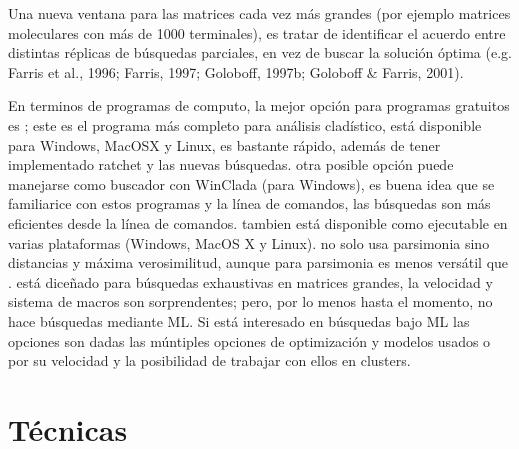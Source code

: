 Una nueva ventana para las matrices cada vez m\'as grandes (por ejemplo matrices moleculares con m\'as de 1000 terminales),  es tratar de identificar el acuerdo entre distintas r\'eplicas de b\'usquedas parciales,  en vez de buscar la soluci\'on \'optima {\color{red}(e.g. Farris et al.,  1996; Farris,  1997; Goloboff,  1997b; Goloboff \& Farris,  2001)}. 

En terminos de programas de computo,  la mejor opci\'on para programas gratuitos es ; este es el programa m\'as  completo para an\'alisis clad\'istico, est\'a disponible para Windows, MacOSX y Linux, es bastante r\'apido, adem\'as de tener implementado ratchet y las nuevas b\'usquedas.   otra posible opci\'on puede manejarse como buscador con WinClada (para Windows),  es buena idea que se familiarice con estos programas y la l\'inea de comandos, las b\'usquedas son m\'as eficientes desde la l\'inea de comandos.   tambien est\'a disponible como ejecutable en varias plataformas (Windows, MacOS X y Linux).    no solo usa parsimonia sino distancias y m\'axima verosimilitud, aunque para parsimonia es menos vers\'atil que .   est\'a dice\~nado para b\'usquedas exhaustivas en matrices grandes, la velocidad y sistema de macros son sorprendentes; pero, por lo menos hasta el momento, no hace b\'usquedas mediante ML. Si est\'a interesado en b\'usquedas bajo ML las opciones son  dadas las m\'untiples opciones de optimizaci\'on y modelos usados o  por su velocidad y la posibilidad de trabajar con ellos en clusters.


\section*{T\'ecnicas}

